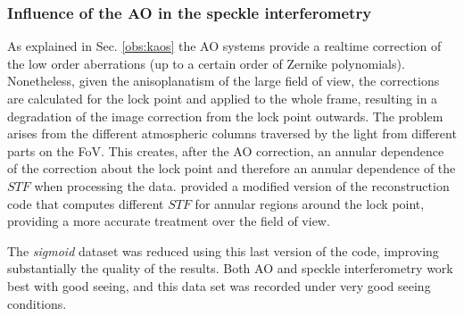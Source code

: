 \subsubsection*{Influence of the AO in the speckle interferometry\label{SIbao}}
As explained in Sec. \ref{obs:kaos} the AO systems provide a realtime correction of the low order aberrations (up to a certain order of Zernike polynomials). Nonetheless, given the anisoplanatism of the large field of view, the corrections are calculated for the lock point and applied to the whole frame, resulting in a degradation of the image correction from the lock point outwards. The problem arises from the different atmospheric columns traversed by the light from different parts on the FoV. This creates, after the AO correction, an annular dependence of the correction about the lock point and therefore an annular dependence of the $STF$ when processing the data. \cite{2006A&A...454.1011P} provided a modified version of the reconstruction code that computes different $STF$ for annular regions around the lock point, providing a more accurate treatment over the field of view.

The \emph{sigmoid} dataset was reduced using this last version of the code, improving substantially the quality of the results. Both AO and speckle interferometry work best with good seeing, and this data set was recorded under very good seeing conditions.

